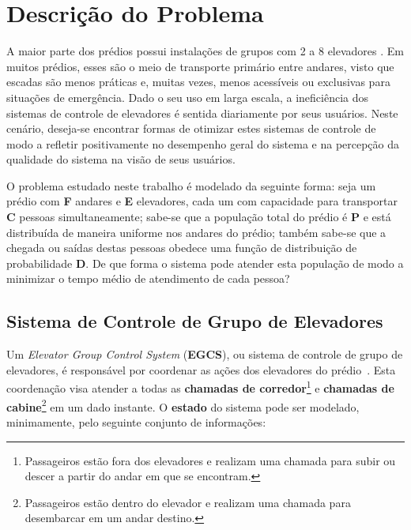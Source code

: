 \chapter{\label{chap:problem}Descrição do Problema}

A maior parte dos prédios possui instalações de grupos com 2 a 8 elevadores
\cite{KOEHLEROTTIGER02}. Em muitos prédios, esses são o meio de transporte
primário entre andares, visto que escadas são menos práticas e, muitas vezes,
menos acessíveis ou exclusivas para situações de emergência. Dado o seu uso em
larga escala, a ineficiência dos sistemas de controle de elevadores é sentida
diariamente por seus usuários. Neste cenário, deseja-se encontrar formas de
otimizar estes sistemas de controle de modo a refletir positivamente no
desempenho geral do sistema e na percepção da qualidade do sistema na visão de
seus usuários.

O problema estudado neste trabalho é modelado da seguinte forma: seja um prédio
com \textbf{F} andares e \textbf{E} elevadores, cada um com capacidade para
transportar \textbf{C} pessoas simultaneamente; sabe-se que a população total do
prédio é \textbf{P} e está distribuída de maneira uniforme nos andares do
prédio; também sabe-se que a chegada ou saídas destas pessoas obedece uma função
de distribuição de probabilidade \textbf{D}. De que forma o sistema pode atender
esta população de modo a minimizar o tempo médio de atendimento de cada pessoa?

\section{\label{section:egcs}Sistema de Controle de Grupo de Elevadores}

Um \textit{Elevator Group Control System} (\textbf{EGCS}), ou sistema de
controle de grupo de elevadores, é responsável por coordenar as ações dos
elevadores do prédio~\cite{kuzunuki1984elevator}. Esta coordenação visa atender
a todas as \textbf{chamadas de corredor}\footnote{Passageiros estão fora dos
elevadores e realizam uma chamada para subir ou descer a partir do andar em que
se encontram.} e \textbf{chamadas de cabine}\footnote{Passageiros estão dentro
do elevador e realizam uma chamada para desembarcar em um andar destino.} em um
dado instante. O \textbf{estado} do sistema pode ser modelado, minimamente, pelo
seguinte conjunto de informações:

